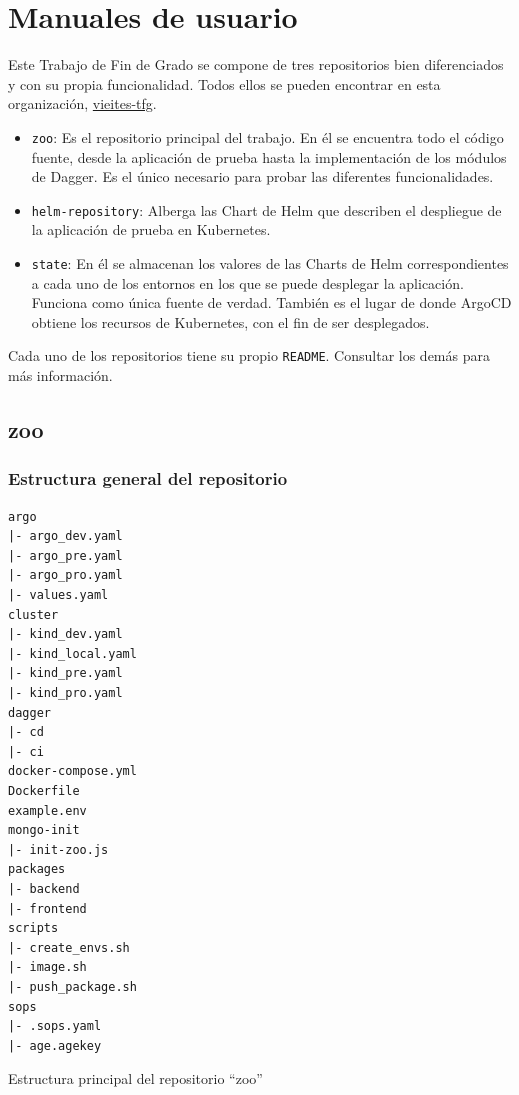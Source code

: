 \chapter{Manuales de usuario}
\label{chap:usuario}
%
Este Trabajo de Fin de Grado se compone de tres repositorios bien diferenciados y con su propia funcionalidad. Todos ellos se pueden encontrar en esta organización, \href{https://github.com/vieites-tfg}{vieites-tfg}.

\begin{itemize}
  \item \texttt{zoo}: Es el repositorio principal del trabajo. En él se encuentra todo el código fuente, desde la aplicación de prueba hasta la implementación de los módulos de Dagger. Es el único necesario para probar las diferentes funcionalidades.
  \item \texttt{helm-repository}: Alberga las Chart de Helm que describen el despliegue de la aplicación de prueba en Kubernetes.
  \item \texttt{state}: En él se almacenan los valores de las Charts de Helm correspondientes a cada uno de los entornos en los que se puede desplegar la aplicación. Funciona como única fuente de verdad. También es el lugar de donde ArgoCD obtiene los recursos de Kubernetes, con el fin de ser desplegados.
\end{itemize}

Cada uno de los repositorios tiene su propio \texttt{README}. Consultar los demás para más información.

\section{zoo}

\subsection*{Estructura general del repositorio}

\begin{longlisting}
  \begin{verbatim}
argo
|- argo_dev.yaml
|- argo_pre.yaml
|- argo_pro.yaml
|- values.yaml
cluster
|- kind_dev.yaml
|- kind_local.yaml
|- kind_pre.yaml
|- kind_pro.yaml
dagger
|- cd
|- ci
docker-compose.yml
Dockerfile
example.env
mongo-init
|- init-zoo.js
packages
|- backend
|- frontend
scripts
|- create_envs.sh
|- image.sh
|- push_package.sh
sops
|- .sops.yaml
|- age.agekey
\end{verbatim}
\caption{Estructura principal del repositorio ``zoo''}
\end{longlisting}

